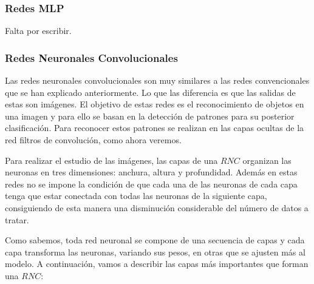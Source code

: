 \documentclass[11pt]{article} %
\begin{document}
\subsubsection{Redes MLP}

Falta por escribir.



\subsubsection{Redes Neuronales Convolucionales}

Las redes neuronales convolucionales son muy similares a las redes convencionales que se han explicado anteriormente. Lo que las diferencia es que las salidas de estas son imágenes. El objetivo de estas redes es el reconocimiento de objetos en una imagen y para ello se basan en la detección de patrones para su posterior clasificación. Para reconocer estos patrones se realizan en las capas ocultas de la red filtros de convolución, como ahora veremos.

Para realizar el estudio de las imágenes, las capas de una $RNC$ organizan las neuronas en tres dimensiones: anchura, altura y profundidad. Además en estas redes no se impone la condición de que cada una de las neuronas de cada capa tenga que estar conectada con todas las neuronas de la siguiente capa, consiguiendo de esta manera una disminución considerable del número de datos a tratar.

Como sabemos, toda red neuronal se compone de una secuencia de capas y cada capa transforma las neuronas, variando sus pesos, en otras que se ajusten más al modelo. A continuación, vamos a describir las capas más importantes que forman una $RNC$:
\end{document}
